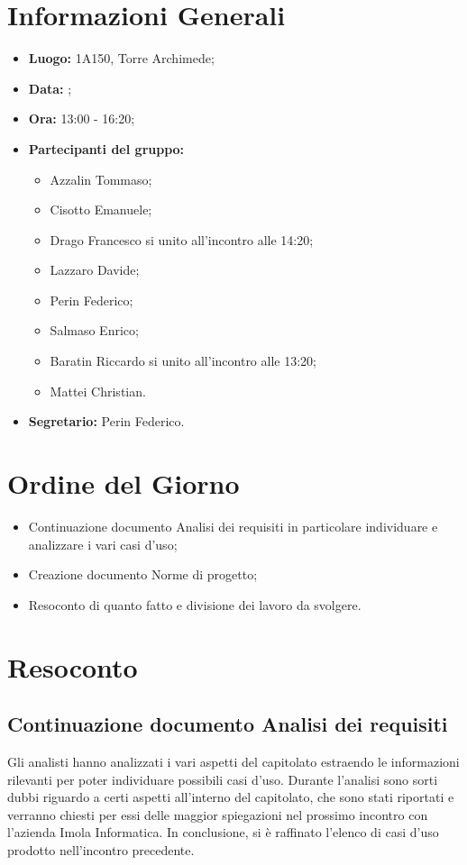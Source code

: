 \section{Informazioni Generali}
\begin{itemize}
\item \textbf{Luogo:} 1A150, Torre Archimede;
\item \textbf{Data:} \Data;
\item \textbf{Ora:} 13:00 - 16:20;
\item \textbf{Partecipanti del gruppo:}
	\begin{itemize}
	\item Azzalin Tommaso; 
	\item Cisotto Emanuele; 
	\item Drago Francesco si unito all'incontro alle 14:20;
	\item Lazzaro Davide;
	\item Perin Federico;
	\item Salmaso Enrico;
	\item Baratin Riccardo si unito all'incontro alle 13:20;
	\item Mattei Christian.
	\end{itemize} 
\item \textbf{Segretario:} Perin Federico.
\end{itemize}

\clearpage

\section{Ordine del Giorno}
\begin{itemize}
	\item Continuazione documento Analisi dei requisiti in particolare individuare e analizzare i vari casi d'uso;
	\item Creazione documento Norme di progetto;
	\item Resoconto di quanto fatto e divisione dei lavoro da svolgere.
\end{itemize}

\clearpage

\section{Resoconto}
\subsection{Continuazione documento Analisi dei requisiti}
Gli analisti hanno analizzati i vari aspetti del capitolato estraendo le informazioni rilevanti per poter individuare possibili casi d’uso. Durante l’analisi sono sorti dubbi riguardo a certi aspetti all’interno del capitolato, che sono stati riportati e verranno chiesti per essi delle maggior spiegazioni nel prossimo incontro con l’azienda Imola Informatica. In conclusione, si è raffinato l’elenco di casi d’uso prodotto nell’incontro precedente.\\

